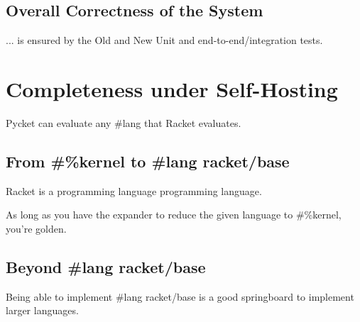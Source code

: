 		\subsection{Overall Correctness of the System}

			\begin{mainpoint}
				... is ensured by the Old and New Unit and end-to-end/integration tests.
			\end{mainpoint}

	\section{Completeness under Self-Hosting}

		\begin{mainpoint}
			Pycket can evaluate any \#lang that Racket evaluates.
		\end{mainpoint}

		\subsection{From \#\%kernel to \#lang racket/base}
			\begin{mainpoint}
				Racket is a programming language programming language.

				As long as you have the expander to reduce the given language to \#\%kernel, you're golden.
			\end{mainpoint}
		
		\subsection{Beyond \#lang racket/base}
			\begin{mainpoint}
				Being able to implement \#lang racket/base is a good springboard to implement larger languages.
			\end{mainpoint}
